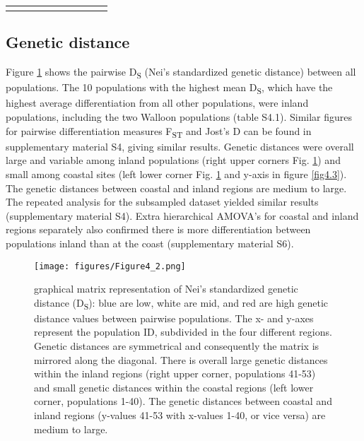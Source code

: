 \documentclass[10pt, twoside]{book} %
\begin{document}
\begin{table}[h!]
\begin{center}
\begin{footnotesize}
\begin{tabular}{p{1.5cm} l r r r r p{1cm} p{1cm} p{1.2cm}}
					
					\arrayrulecolor{black}\bottomrule
				\end{tabular}\endgroup
			\end{footnotesize}
		\end{center}
		\end{table}
	
	
	\subsection{Genetic distance}
	Figure \ref{fig4.2} shows the pairwise D\textsubscript{S} (Nei's standardized genetic distance) between all populations. The 10 populations with the highest mean D\textsubscript{S}, which have the highest average differentiation from all other populations, were inland populations, including the two Walloon populations (table S4.1). Similar figures for pairwise differentiation measures F\textsubscript{ST} and Jost's D can be found in supplementary material S4, giving similar results. Genetic distances were overall large and variable among inland populations (right upper corners Fig. \ref{fig4.2}) and small among coastal sites (left lower corner Fig. \ref{fig4.2} and y-axis in figure \ref{fig4.3}). The genetic distances between coastal and inland regions are medium to large. The repeated analysis for the subsampled dataset yielded similar results (supplementary material S4). Extra hierarchical AMOVA's for coastal and inland regions separately also confirmed there is more differentiation between populations inland than at the coast (supplementary material S6).\\
	
	\clearpage
	\hbox{}
	\vspace*{\fill}
	\begin{figure}[h!]
		\begin{center}
			\texttt{[image: figures/Figure4\_2.png]}
		\end{center}
		\begin{footnotesize}
			\caption{graphical matrix representation of Nei's standardized genetic distance (D\textsubscript{S}): blue are low, white are mid, and red are high genetic distance values between pairwise populations. The x- and y-axes represent the population ID, subdivided in the four different regions. Genetic distances are symmetrical and consequently the matrix is mirrored along the diagonal. There is overall large genetic distances within the inland regions (right upper corner, populations 41-53) and small genetic distances within the coastal regions (left lower corner, populations 1-40). The genetic distances between coastal and inland regions (y-values 41-53 with x-values 1-40, or vice versa) are medium to large. \label{fig4.2}}
		\end{footnotesize}
	\end{figure}
	\vspace*{\fill}
	\clearpage
	
\end{document}
